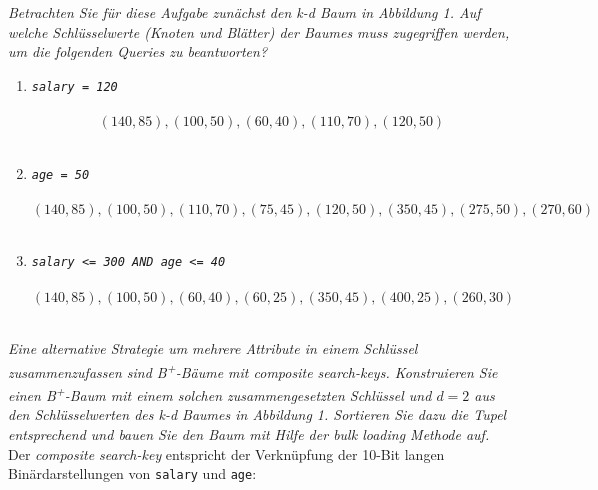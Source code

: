 \documentclass{uni_tue_template}
\newcommand{\code}[1]{\texttt{{\footnotesize #1}}}
\begin{document}
\subExEnd{}
%
\newpage 
%
\exercise{}
  \item \emph{Betrachten Sie für diese Aufgabe zunächst den k-d Baum in Abbildung 1. Auf welche Schlüsselwerte (Knoten und Blätter) der Baumes muss zugegriffen werden, um die folgenden Queries zu beantworten?}
  \begin{enumerate}[{(}a{)}]
    \item \emph{\code{salary = 120}}\\
    \vspace*{-1.3cm}\\
    \[(140,85), (100,50), (60,40), (110,70), (120,50)\]
    \vspace*{-1.3cm}\\
    \item \emph{\code{age = 50}}\\
    \vspace*{-1.3cm}\\
    \[(140,85), (100,50), (110,70), (75,45), (120,50), (350,45), (275,50),
    (270,60)\]
    \vspace*{-1.3cm}\\
    \item \emph{\code{salary <= 300 AND age <= 40}}\\
    \vspace*{-1.3cm}\\
    \[(140,85), (100,50), (60,40), (60,25), (350,45), (400,25), (260,30)\]
     \vspace*{-1.3cm}\\
  \end{enumerate}
  \item \emph{Eine alternative Strategie um mehrere Attribute in einem Schlüssel zusammenzufassen sind B\textsuperscript{+}-Bäume mit \emph{composite search-keys}. Konstruieren Sie einen B\textsuperscript{+}-Baum mit einem solchen zusammengesetzten Schlüssel \code{<salary,age>} und $d=2$ aus den Schlüsselwerten des k-d Baumes in Abbildung 1. Sortieren Sie dazu die Tupel entsprechend und bauen Sie den Baum mit Hilfe der \emph{bulk loading} Methode auf.}\\
  Der \emph{composite search-key} entspricht der Verknüpfung der 10-Bit langen Binärdarstellungen von \code{salary} und \code{age}:\\
  \vspace*{-.7cm}\\
\end{document}
